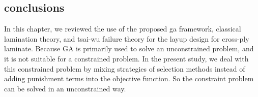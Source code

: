 \subsection{conclusions}
In this chapter, we reviewed the use of the proposed ga framework, classical
lamination theory, and tsai-wu failure theory for the layup design for
cross-ply laminate. Because GA is primarily used to solve an unconstrained
problem, and it is not suitable for a constrained problem. In the present
study, we deal with this constrained problem by mixing strategies of selection
methods instead of adding punishment terms into the objective function. So the
constraint problem can be solved in an unconstrained way.

